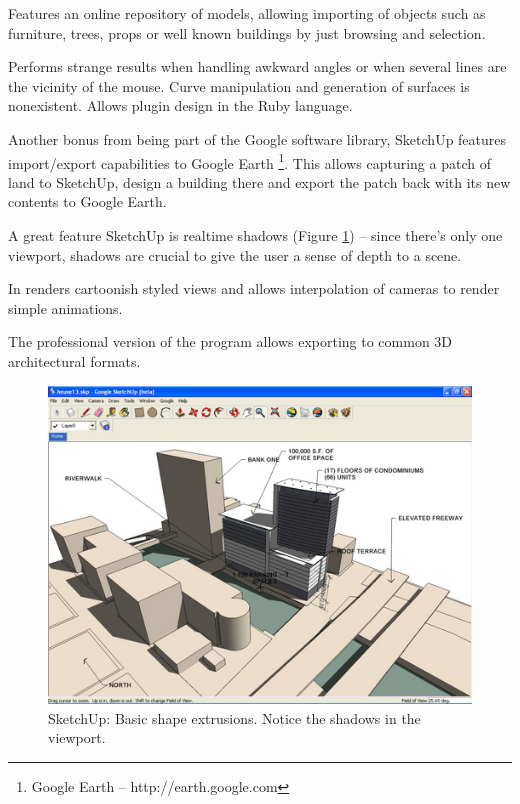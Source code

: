 Features an online repository of models, allowing importing of objects such as
furniture, trees, props or well known buildings by just browsing and selection.

Performs strange results when handling awkward angles or when several lines
are the vicinity of the mouse.
Curve manipulation and generation of surfaces is nonexistent.
Allows plugin design in the Ruby language.

Another bonus from being part of the Google software library, SketchUp features import/export capabilities to Google Earth
\footnote{Google Earth -- http://earth.google.com}\nocite{SITE-EARTH}.
This allows capturing a patch of land to SketchUp, design a building there and export the patch
back with its new contents to Google Earth.

A great feature SketchUp is realtime shadows (Figure \ref{FIG-SKETCHUP}) -- since there's only one viewport, shadows are crucial to give the user a sense of depth to a scene.

In renders cartoonish styled views and allows interpolation of cameras to render simple animations.

The professional version of the program allows exporting to common 3D architectural formats.


\begin{figure}[!ht]
    \centering
    \includegraphics[width=12cm]{gfx/sketchup-1.png}
    \caption{SketchUp: Basic shape extrusions. Notice the shadows in the viewport.}
    \label{FIG-SKETCHUP}
\end{figure}

\newpage


